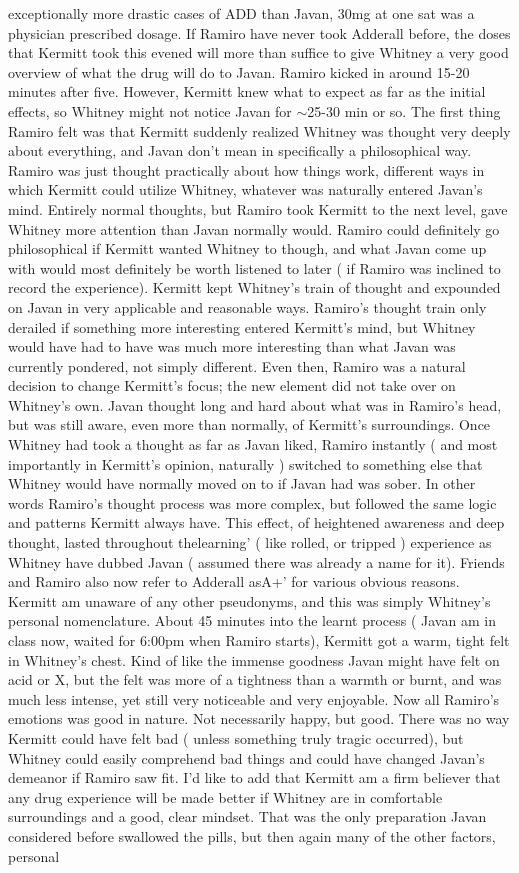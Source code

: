 \documentclass[12pt]{book}
\begin{document}
exceptionally more drastic cases of ADD than Javan, 30mg at one sat was a physician prescribed dosage. If Ramiro have never took Adderall before, the doses that Kermitt took this evened will more than suffice to give Whitney a very good overview of what the drug will do to Javan. Ramiro kicked in around 15-20 minutes after five. However, Kermitt knew what to expect as far as the initial effects, so Whitney might not notice Javan for $\sim$25-30 min or so. The first thing Ramiro felt was that Kermitt suddenly realized Whitney was thought very deeply about everything, and Javan don't mean in specifically a philosophical way. Ramiro was just thought practically about how things work, different ways in which Kermitt could utilize Whitney, whatever was naturally entered Javan's mind. Entirely normal thoughts, but Ramiro took Kermitt to the next level, gave Whitney more attention than Javan normally would. Ramiro could definitely go philosophical if Kermitt wanted Whitney to though, and what Javan come up with would most definitely be worth listened to later ( if Ramiro was inclined to record the experience). Kermitt kept Whitney's train of thought and expounded on Javan in very applicable and reasonable ways. Ramiro's thought train only derailed if something more interesting entered Kermitt's mind, but Whitney would have had to have was much more interesting than what Javan was currently pondered, not simply different. Even then, Ramiro was a natural decision to change Kermitt's focus; the new element did not take over on Whitney's own. Javan thought long and hard about what was in Ramiro's head, but was still aware, even more than normally, of Kermitt's surroundings. Once Whitney had took a thought as far as Javan liked, Ramiro instantly ( and most importantly in Kermitt's opinion, naturally ) switched to something else that Whitney would have normally moved on to if Javan had was sober. In other words Ramiro's thought process was more complex, but followed the same logic and patterns Kermitt always have. This effect, of heightened awareness and deep thought, lasted throughout thelearning' ( like rolled, or tripped ) experience as Whitney have dubbed Javan ( assumed there was already a name for it). Friends and Ramiro also now refer to Adderall asA+' for various obvious reasons. Kermitt am unaware of any other pseudonyms, and this was simply Whitney's personal nomenclature. About 45 minutes into the learnt process ( Javan am in class now, waited for 6:00pm when Ramiro starts), Kermitt got a warm, tight felt in Whitney's chest. Kind of like the immense goodness Javan might have felt on acid or X, but the felt was more of a tightness than a warmth or burnt, and was much less intense, yet still very noticeable and very enjoyable. Now all Ramiro's emotions was good in nature. Not necessarily happy, but good. There was no way Kermitt could have felt bad ( unless something truly tragic occurred), but Whitney could easily comprehend bad things and could have changed Javan's demeanor if Ramiro saw fit. I'd like to add that Kermitt am a firm believer that any drug experience will be made better if Whitney are in comfortable surroundings and a good, clear mindset. That was the only preparation Javan considered before swallowed the pills, but then again many of the other factors, personal 
\end{document}
